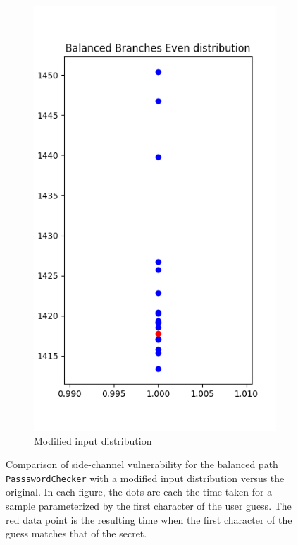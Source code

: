 \begin{figure}
\begin{subfigure}{.5\textwidth}
  \includegraphics[width=.7\linewidth]{figures/distribution_branches2.png}
  \caption{Modified input distribution}
  \label{fig:sub2}
\end{subfigure}
\caption{Comparison of side-channel vulnerability for the balanced path \texttt{PassswordChecker} with a modified input distribution versus the original. In each figure, the dots are each the time taken for a sample parameterized by the first character of the user guess. The red data point is the resulting time when the first character of the guess matches that of the secret.}
\label{fig:test}
\end{figure}

